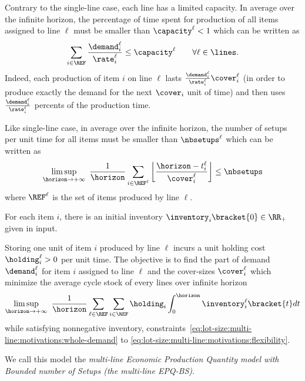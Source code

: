 Contrary to the single-line case, each line has a limited capacity.
In average over the infinite horizon, the percentage of time spent for production of all items assigned to line $\ell$ must be smaller than $\capacity^{\ell}<1$ which can be written as
\begin{equation}\label{eq:lot-size:multi-line:motivations:capacity}
  \sum_{i\in\REF}\frac{\demand_i^{\ell}}{\rate_i^{\ell}}\le\capacity^{\ell}\qquad\forall \ell\in\lines.
\end{equation}
Indeed, each production of item $i$ on line $\ell$ lasts $\frac{\demand_i^{\ell}}{\rate_i^{\ell}}\cover_i^{\ell}$ (in order to produce exactly the demand for the next $\cover_i$ unit of time) and then uses $\frac{\demand_i^{\ell}}{\rate_i^{\ell}}$ percents of the production time.


Like single-line case, in average over the infinite horizon, the number of setups per unit time for all items must be smaller than $\nbsetups^{\ell}$ which can be written as
\begin{equation}\label{eq:lot-size:multi-line:motivations:flexibility}
  \limsup_{\horizon\rightarrow+\infty}\ \frac{1}{\horizon} \sum_{i\in\REF^{\ell}} \left\lfloor\frac{\horizon-t_i^{\ell}}{\cover_i^{\ell}}\right\rfloor \le \nbsetups
\end{equation}
where $\REF^{\ell}$ is the set of items produced by line $\ell$.


For each item $i$, there is an initial inventory $\inventory_i\bracket{0}\in\RR_+$ given in input.


Storing one unit of item $i$ produced by line $\ell$ incurs a unit holding cost $\holding_i^{\ell}>0$ per unit time.
The objective is to find the part of demand $\demand_i^{\ell}$ for item $i$ assigned to line $\ell$ and the cover-sizes $\cover_i^{\ell}$ which minimize the average cycle stock of every lines over infinite horizon
\begin{equation}
  \limsup_{\horizon\rightarrow+\infty}\ \frac{1}{\horizon} \sum_{\ell\in\REF} \sum_{i\in\REF} \holding_i \int_0^{\horizon}\inventory_i^{\ell}\bracket{t}dt
\end{equation}
while satisfying nonnegative inventory, constraints~\eqref{eq:lot-size:multi-line:motivations:whole-demand} to \eqref{eq:lot-size:multi-line:motivations:flexibility}.

\medskip


We call this model the \emph{multi-line Economic Production Quantity model with Bounded number of Setups (the multi-line EPQ-BS)}.

